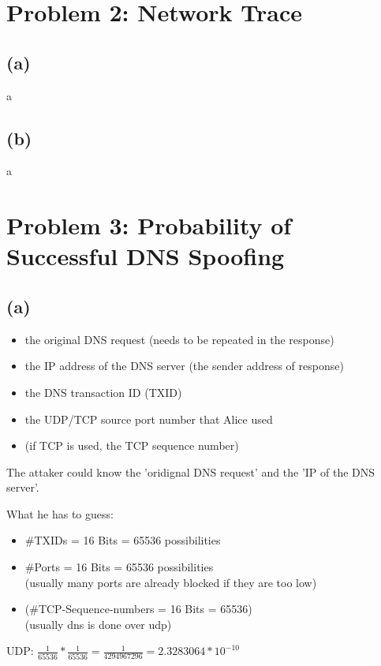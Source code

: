 \documentclass[12pt,pdftex,a4paper]{article}
\begin{document}
\newpage
\section*{Problem 2: Network Trace}
\subsection*{(a)}
a

\subsection*{(b)}
a

\section*{Problem 3: Probability of Successful DNS Spoofing}
\subsection*{(a)}
\begin{itemize}
	\item the original DNS request (needs to be repeated in the response)
	\item the IP address of the DNS server (the sender address of response)
	\item the DNS transaction ID (TXID)
	\item the UDP/TCP source port number that Alice used
	\item (if TCP is used, the TCP sequence number)
\end{itemize}

The attaker could know the 'oridignal DNS request' and the 'IP of the DNS server'.

What he has to guess:

\begin{itemize}
	\item \#TXIDs = 16 Bits = 65536 possibilities
	\item \#Ports = 16 Bits = 65536 possibilities\\(usually many ports are already blocked if they are too low)
	\item (\#TCP-Sequence-numbers = 16 Bits = 65536)\\(usually dns is done over udp)
\end{itemize}

UDP: $ \frac{1}{65536} * \frac{1}{65536} = \frac{1}{4294967296} = 2.3283064*10^{-10} $
\\
\end{document}
